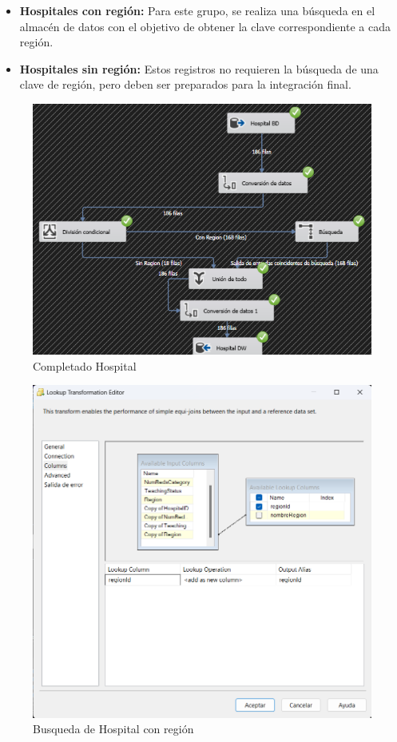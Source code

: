 \documentclass{article}
\begin{document}
	\begin{itemize}
		\item \textbf{Hospitales con región:} Para este grupo, se realiza una búsqueda en el almacén de datos con el objetivo de obtener la clave correspondiente a cada región.
		\item \textbf{Hospitales sin región:} Estos registros no requieren la búsqueda de una clave de región, pero deben ser preparados para la integración final.
	\end{itemize}
	
	
	\begin{figure}[H]
		\centering
		\includegraphics[width=.7\linewidth]{./images/completados/hospital.png}
		\caption{Completado Hospital}
	\end{figure}
	\begin{figure}[H]
		\centering
		\includegraphics[width=.7\linewidth]{./images/busquedas/hospital_con_region.png}
		\caption{Busqueda de Hospital con región}
	\end{figure}
\end{document}
